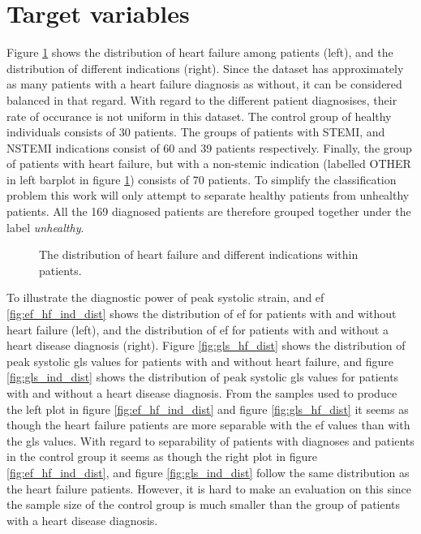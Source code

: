 \section{Target variables} \label{sec:target}
Figure \ref{fig:hf_ind_dist} shows the distribution of heart failure among patients (left), and the distribution of different indications (right). Since the dataset has approximately as many patients with a heart failure diagnosis as without, it can be considered balanced in that regard. With regard to the different patient diagnosises, their rate of occurance is not uniform in this dataset. The control group of healthy individuals consists of 30 patients. The groups of patients with STEMI, and NSTEMI indications consist of 60 and 39 patients respectively. Finally, the group of patients with heart failure, but with a non-stemic indication (labelled OTHER in left barplot in figure \ref{fig:hf_ind_dist}) consists of 70 patients. To simplify the classification problem this work will only attempt to separate healthy patients from unhealthy patients. All the 169 diagnosed patients are therefore grouped together under the label \textit{unhealthy}. \bigskip

\begin{figure}[h]
    \centering
    
    \caption{The distribution of heart failure and different indications within patients.}
    \label{fig:hf_ind_dist}
\end{figure}

To illustrate the diagnostic power of peak systolic strain, and \acrshort{ef} \ref{fig:ef_hf_ind_dist} shows the distribution of \acrshort{ef} for patients with and without heart failure (left), and the distribution of \acrshort{ef} for patients with and without a heart disease diagnosis (right). Figure \ref{fig:gls_hf_dist} shows the distribution of peak systolic \acrshort{gls} values for patients with and without heart failure, and figure \ref{fig:gls_ind_dist} shows the distribution of peak systolic \acrshort{gls} values for patients  with and without a heart disease diagnosis. From the samples used to produce the left plot in figure \ref{fig:ef_hf_ind_dist} and figure \ref{fig:gls_hf_dist} it seems as though the heart failure patients are more separable with the \acrshort{ef} values than with the \acrshort{gls} values. With regard to separability of patients with diagnoses and patients in the control group it seems as though the right plot in figure \ref{fig:ef_hf_ind_dist}, and figure \ref{fig:gls_ind_dist} follow the same distribution as the heart failure patients. However, it is hard to make an evaluation on this since the sample size of the control group is much smaller than the group of patients with a heart disease diagnosis.\bigskip

